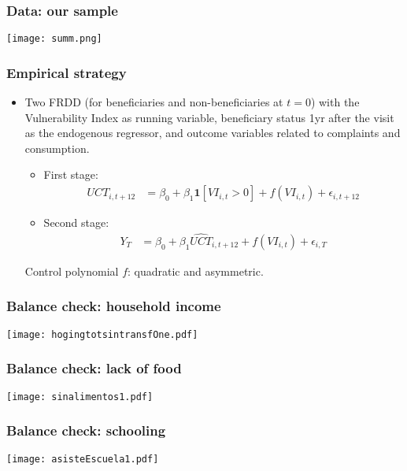 \documentclass{beamer}
\begin{document}
\begin{frame}
\frametitle{Data: our sample}
\begin{center}
\texttt{[image: summ.png]}
\label{summ}
\end{center}
\end{frame}


\begin{frame}
\frametitle{Empirical strategy}
\begin{itemize}
	\item Two FRDD (for beneficiaries and non-beneficiaries at $t=0$) with the Vulnerability Index as running variable, beneficiary status 1yr after the visit as the endogenous regressor, and outcome variables related to complaints and consumption.
	\begin{itemize}
		\item First stage:	
		\begin{align*}
		UCT_{i,t+12} & = \beta _0 + \beta_1\mathbf{1}[VI_{i,t}>0] + f(VI_{i,t}) + \epsilon_{i,t+12}
		\end{align*}
		\item Second stage:	
		\begin{align*}
		Y_{T} & = \beta _0 + \beta_1\hat{UCT}_{i,t+12} + f(VI_{i,t}) + \epsilon_{i,T}
		\end{align*}
	\end{itemize}
Control polynomial $f$: quadratic and asymmetric.
\end{itemize}
\end{frame}

\begin{frame}
\frametitle{Balance check: household income}
\begin{center}
	\texttt{[image: hogingtotsintransfOne.pdf]} 
	\label{hogingtotsintransfOne}
\end{center}
\end{frame}

\begin{frame}
\frametitle{Balance check: lack of food}
\begin{center}
	\texttt{[image: sinalimentos1.pdf]} 
	\label{sinalimentos1}
\end{center}
\end{frame}

\begin{frame}
\frametitle{Balance check: schooling}
\begin{center}
	\texttt{[image: asisteEscuela1.pdf]} 
	\label{asisteEscuela1}
\end{center}
\end{frame}
\end{document}
